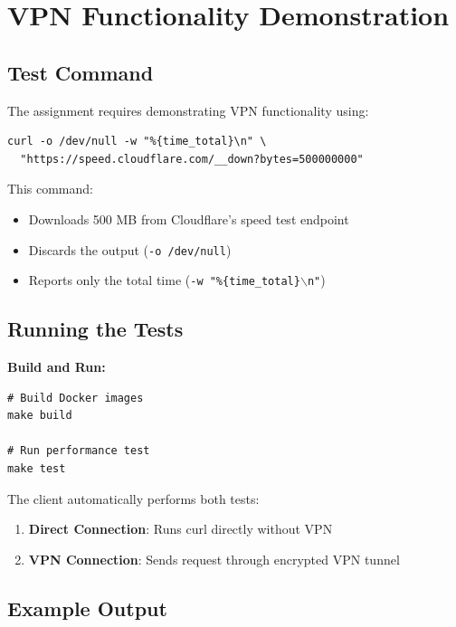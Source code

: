 \documentclass[12pt,a4paper]{article}
\begin{document}
\section{VPN Functionality Demonstration}

\subsection{Test Command}

The assignment requires demonstrating VPN functionality using:

\begin{lstlisting}[style=bashstyle, caption={Performance test command}]
curl -o /dev/null -w "%{time_total}\n" \
  "https://speed.cloudflare.com/__down?bytes=500000000"
\end{lstlisting}

This command:
\begin{itemize}
    \item Downloads 500 MB from Cloudflare's speed test endpoint
    \item Discards the output (\texttt{-o /dev/null})
    \item Reports only the total time (\texttt{-w "\%\{time\_total\}$\backslash$n"})
\end{itemize}

\subsection{Running the Tests}

\textbf{Build and Run:}
\begin{lstlisting}[style=bashstyle, caption={Build and test VPN}]
# Build Docker images
make build

# Run performance test
make test
\end{lstlisting}

The client automatically performs both tests:
\begin{enumerate}
    \item \textbf{Direct Connection}: Runs curl directly without VPN
    \item \textbf{VPN Connection}: Sends request through encrypted VPN tunnel
\end{enumerate}

\subsection{Example Output}
\end{document}
